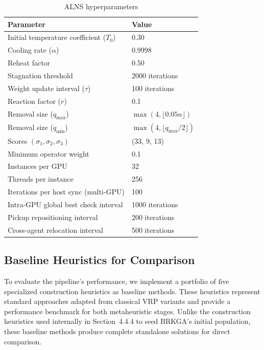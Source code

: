 \documentclass{article}
\begin{document}
\begin{table}[t]
\centering
\caption{ALNS hyperparameters}
\label{tab:alns_config}
\begin{tabular}{ll}
\toprule
Parameter & Value \\
\midrule
Initial temperature coefficient ($T_0$) & 0.30 \\
Cooling rate ($\alpha$) & 0.9998 \\
Reheat factor & 0.50 \\
Stagnation threshold & 2000 iterations \\
Weight update interval ($\tau$) & 100 iterations \\
Reaction factor ($r$) & 0.1 \\
Removal size ($q_{\max}$) & $\max(4, \lfloor 0.05n \rfloor)$ \\
Removal size ($q_{\min}$) & $\max(4, \lfloor q_{\max}/2 \rfloor)$ \\
Scores $(\sigma_1, \sigma_2, \sigma_3)$ & (33, 9, 13) \\
Minimum operator weight & 0.1 \\
Instances per GPU & 32 \\
Threads per instance & 256 \\
Iterations per host sync (multi-GPU) & 100 \\
Intra-GPU global best check interval & 1000 iterations \\
Pickup repositioning interval & 200 iterations \\
Cross-agent relocation interval & 500 iterations \\
\bottomrule
\end{tabular}
\end{table}

\subsection{Baseline Heuristics for Comparison}

To evaluate the pipeline's performance, we implement a portfolio of five specialized construction heuristics as baseline methods. These heuristics represent standard approaches adapted from classical VRP variants and provide a performance benchmark for both metaheuristic stages. Unlike the construction heuristics used internally in Section~4.4.4 to seed BRKGA's initial population, these baseline methods produce complete standalone solutions for direct comparison.
\end{document}
